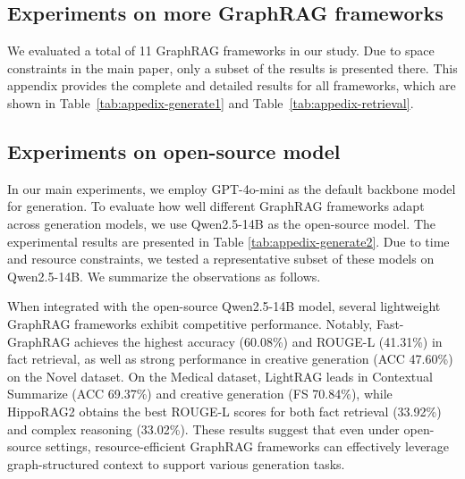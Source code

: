 \documentclass{article} %
\begin{document}


\subsection{Experiments on more GraphRAG frameworks}
We evaluated a total of 11 GraphRAG frameworks in our study. Due to space constraints in the main paper, only a subset of the results is presented there. This appendix provides the complete and detailed results for all frameworks, which are shown in Table~\ref{tab:appedix-generate1} and Table~\ref{tab:appedix-retrieval}.


\subsection{Experiments on open-source model}
In our main experiments, we employ GPT-4o-mini as the default backbone model for generation. To evaluate how well different GraphRAG frameworks adapt across generation models, we use Qwen2.5-14B as the open-source model. The experimental results are presented in Table \ref{tab:appedix-generate2}. Due to time and resource constraints, we tested a representative subset of these models on Qwen2.5-14B. We summarize the observations as follows. 

When integrated with the open-source Qwen2.5-14B model, several lightweight GraphRAG frameworks exhibit competitive performance. Notably, Fast-GraphRAG achieves the highest accuracy (60.08\%) and ROUGE-L (41.31\%) in fact retrieval, as well as strong performance in creative generation (ACC 47.60\%) on the Novel dataset. On the Medical dataset, LightRAG leads in Contextual Summarize (ACC 69.37\%) and creative generation (FS 70.84\%), while HippoRAG2 obtains the best ROUGE-L scores for both fact retrieval (33.92\%) and complex reasoning (33.02\%). These results suggest that even under open-source settings, resource-efficient GraphRAG frameworks can effectively leverage graph-structured context to support various generation tasks.
\end{document}
